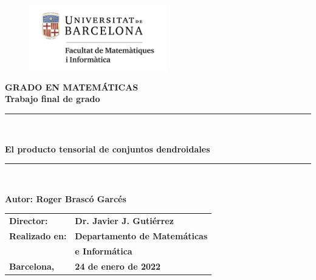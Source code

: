 \documentclass[11pt,a4paper,openright,oneside]{article}
\numberwithin{equation}{section}
\theoremstyle{definition}
\begin{document}
\thispagestyle{empty}


\begin{titlepage}
    \begin{center}
        \begin{figure}[htb]
            \begin{center}
                \includegraphics[width=6cm]{matematiquesinformatica-pos-rgb.png}
            \end{center}
        \end{figure}
        \vspace*{1cm}
        \textbf{\LARGE GRADO EN MATEM\'{A}TICAS } \\
        \vspace*{.5cm}
        \textbf{\LARGE Trabajo final de grado} \\
        \vspace*{1.5cm}
        \rule{16cm}{0.1mm}\\
        \begin{Huge}
            \textbf{El producto tensorial de conjuntos dendroidales} \\
        \end{Huge}
        \rule{16cm}{0.1mm}\\
        \vspace{1cm}
        \begin{flushright}
            \textbf{\LARGE Autor: Roger Brasc\'o Garc\'es}
            \vspace*{2cm}
            \renewcommand{\arraystretch}{1.5}
            \begin{tabular}{ll}
                \textbf{\Large Director:}     & \textbf{\Large Dr. Javier J. Guti\'errez }     \\
                \textbf{\Large Realizado en:} & \textbf{\Large  Departamento de Matem\'aticas} \\
                                              & \textbf{\Large e Inform\'atica}                \\
                \textbf{\Large Barcelona,}    & \textbf{\Large 24 de enero de 2022 }
            \end{tabular}
        \end{flushright}
    \end{center}
\end{titlepage}
\newpage
\end{document}
